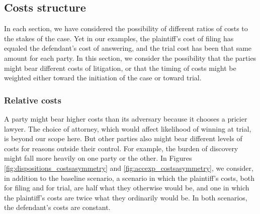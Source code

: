 \documentclass{article}
\begin{document}
\subsection{Costs structure}

In each section, we have considered the possibility of different ratios of costs to the stakes of the case. Yet in our examples, the plaintiff's cost of filing has equaled the defendant's cost of answering, and the trial cost has been that same amount for each party. In this section, we consider the possibility that the parties might bear different costs of litigation, or that the timing of costs might be weighted either toward the initiation of the case or toward trial.

\subsubsection{Relative costs}

A party might bear higher costs than its adversary because it chooses a pricier lawyer. The choice of attorney, which would affect likelihood of winning at trial, is beyond our scope here. But other parties also might bear different levels of costs for reasons outside their control. For example, the burden of discovery might fall more heavily on one party or the other. In Figures \ref{fig:dispositions_costsasymmetry} and \ref{fig:accexp_costsasymmetry}, we consider, in addition to the baseline scenario, a scenario in which the plaintiff's costs, both for filing and for trial, are half what they otherwise would be, and one in which the plaintiff's costs are twice what they ordinarily would be. In both scenarios, the defendant's costs are constant. 
\end{document}
